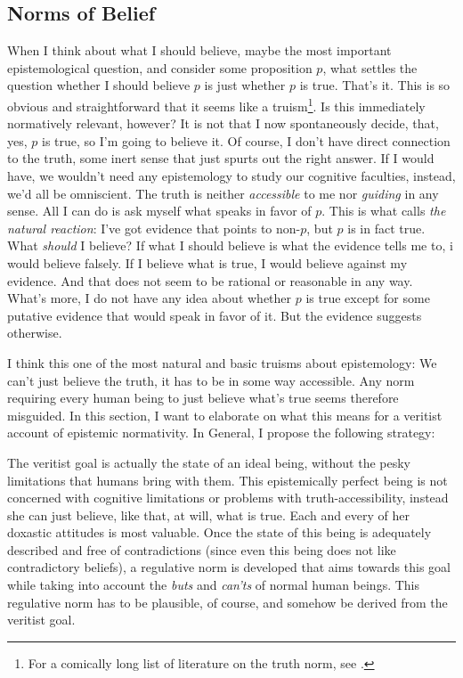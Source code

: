 \documentclass[12pt,numbers=noenddot]{scrartcl}
\begin{document}
\subsection{ Norms of Belief }\label{sec:normsofbelief}

When I think about what I should believe, maybe the most important epistemological question, and consider some proposition $p$, what settles the question whether I should believe $p$ is just whether $p$ is true. That's it. This is so obvious and straightforward that it seems like a truism\footnote{For a comically long list of literature on the truth norm, see \textcite[25]{Mchugh2012-MCHTTN}.}. Is this immediately normatively relevant, however? It is not that I now spontaneously decide, that, yes, $p$ is true, so I'm going to believe it. Of course, I don't have direct connection to the truth, some inert sense that just spurts out the right answer. If I would have, we wouldn't need any epistemology to study our cognitive faculties, instead, we'd all be omniscient. The truth is neither \emph{accessible} to me nor \emph{guiding} in any sense. All I can do is ask myself what speaks in favor of $p$. This is what \textcite{Gibbons2013-GIBTNO} calls \emph{the natural reaction}: I've got evidence that points to non-$p$, but $p$ is in fact true. What \emph{should} I believe? If what I should believe is what the evidence tells me to, i would believe falsely. If I believe what is true, I would believe against my evidence. And that does not seem to be rational or reasonable in any way. What's more, I do not have any idea about whether $p$ is true except for some putative evidence that would speak in favor of it. But the evidence suggests otherwise.

I think this one of the most natural and basic truisms about epistemology: We can't just believe the truth, it has to be in some way accessible. Any norm requiring every human being to just believe what's true seems therefore misguided. In this section, I want to elaborate on what this means for a veritist account of epistemic normativity. In General, I propose the following strategy:

The veritist goal is actually the state of an ideal being, without the pesky limitations that humans bring with them. This epistemically perfect being is not concerned with cognitive limitations or problems with truth-accessibility, instead she can just believe, like that, at will, what is true. Each and every of her doxastic attitudes is most valuable. Once the state of this being is adequately described and free of contradictions (since even this being does not like contradictory beliefs), a regulative norm is developed that aims towards this goal while taking into account the \emph{buts} and \emph{can'ts} of normal human beings. This regulative norm has to be plausible, of course, and somehow be derived from the veritist goal.
\end{document}
